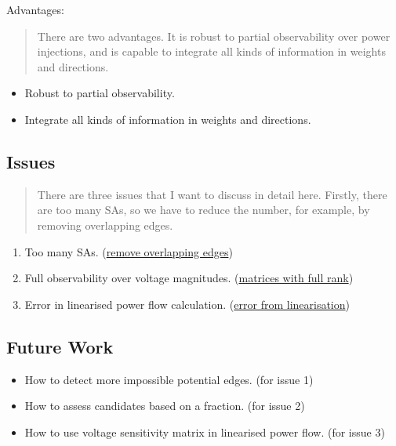 \documentclass[
]{book}
\providecommand{\tightlist}{%
  \setlength{\itemsep}{0pt}\setlength{\parskip}{0pt}}
\begin{document}
Advantages:

\begin{quote}
There are two advantages. It is robust to partial observability over power
injections, and is capable to integrate all kinds of information in weights
and directions.
\end{quote}

\begin{itemize}
\tightlist
\item
  Robust to partial observability.
\item
  Integrate all kinds of information in weights and directions.
\end{itemize}

\hypertarget{issues}{%
\subsection*{Issues}\label{issues}}

\begin{quote}
There are three issues that I want to discuss in detail here. Firstly, there
are too many SAs, so we have to reduce the number, for example, by removing
overlapping edges.
\end{quote}

\begin{enumerate}
\def\labelenumi{\arabic{enumi}.}
\tightlist
\item
  Too many SAs. (\protect\hyperlink{overlapping}{remove overlapping edges})
\item
  Full observability over voltage magnitudes. (\protect\hyperlink{BRM}{matrices with full
  rank})
\item
  Error in linearised power flow calculation. (\protect\hyperlink{error}{error from
  linearisation})
\end{enumerate}

\hypertarget{future-work}{%
\subsection*{Future Work}\label{future-work}}

\begin{itemize}
\tightlist
\item
  How to detect more impossible potential edges. (for issue 1)
\item
  How to assess candidates based on a fraction. (for issue 2)
\item
  How to use voltage sensitivity matrix in linearised power flow. (for issue 3)
\end{itemize}

  
\end{document}
